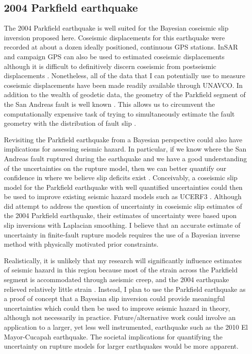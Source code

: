 \documentclass[12pt]{article}
\begin{document}
\subsection*{2004 Parkfield earthquake}
The 2004 Parkfield earthquake is well suited for the Bayesian coseismic slip inversion proposed here.  Coseismic displacements for this earthquake were recorded at about a dozen ideally positioned, continuous GPS stations. InSAR and campaign GPS can also be used to estimated coseismic displacements although it is difficult to definitively discern coseismic from postseismic displacements \citep{Johanson2006}. Nonetheless, all of the data that I can potentially use to measure coseismic displacements have been made readily available through UNAVCO.  In addition to the wealth of geodetic data, the geometry of the Parkfield segment of the San Andreas fault is well known \citep{Simpson2006}.  This allows us to circumvent the computationally expensive task of trying to simultaneously estimate the fault geometry with the distribution of fault slip \citep[e.g.][]{Fukuda2008}. 

Revisiting the Parkfield earthquake from a Bayesian perspective could also have implications for assessing seismic hazard.  In particular, if we know where the San Andreas fault ruptured during the earthquake and we have a good understanding of the uncertainties on the rupture model, then we can better quantify our confidence in where we believe slip deficits exist \citep{Murray2006}.  Conceivably, a coseismic slip model for the Parkfield earthquake with well quantified uncertainties could then be used to improve existing seismic hazard models such as UCERF3 \citep{Field2014}.  Although \citet{Page2009} did attempt to address the question of uncertainty in coseismic slip estimates of the 2004 Parkfield earthquake, their estimates of uncertainty were based upon slip inversions with Laplacian smoothing.  I believe that an accurate estimate of uncertainty in finite-fault rupture models requires the use of a Bayesian inverse method with physically motivated prior constraints.  

Realistically, it is unlikely that my research will significantly influence estimates of seismic hazard in this region because most of the strain across the Parkfield segment is accommodated through aseismic creep, and the 2004 earthquake relieved relatively little strain \citep{Murray2006}.  Instead, I plan to use the Parkfield earthquake as a proof of concept that a Bayesian slip inversion could provide meaningful uncertainties which could then be used to improve seismic hazard in theory, although not necessarily in practice.  Future/alternative work could involve an application to a larger, yet less well instrumented, earthquake such as the 2010 El Mayor-Cucapah earthquake.  The societal implications for quantifying the uncertainty on rupture models for larger earthquakes would be more apparent.
\end{document}

